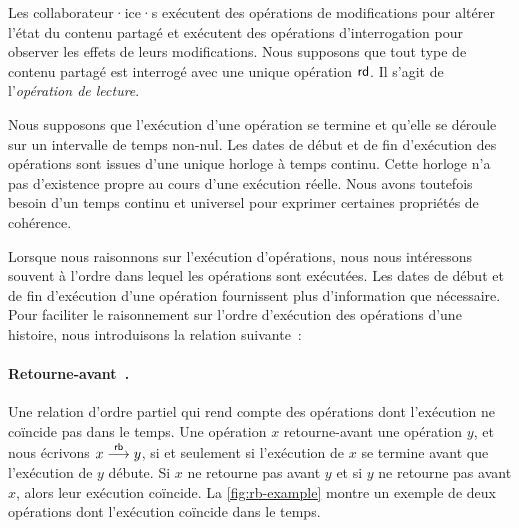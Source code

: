 Les collaborateur·ice·s exécutent des opérations de modifications pour altérer l'état du contenu partagé et exécutent des opérations d'interrogation pour observer les effets de leurs modifications.
Nous supposons que tout type de contenu partagé est interrogé avec une unique opération $\operatorname{\mathsf{rd}}$.
Il s'agit de l'\emph{opération de lecture}.

Nous supposons que l'exécution d'une opération se termine et qu'elle se déroule sur un intervalle de temps non-nul.
Les dates de début et de fin d'exécution des opérations sont issues d'une unique horloge à temps continu.
Cette horloge n'a pas d'existence propre au cours d'une exécution réelle.
Nous avons toutefois besoin d'un temps continu et universel pour exprimer certaines propriétés de cohérence.

Lorsque nous raisonnons sur l'exécution d'opérations, nous nous intéressons souvent à l'ordre dans lequel les opérations sont exécutées.
Les dates de début et de fin d'exécution d'une opération fournissent plus d'information que nécessaire.
Pour faciliter le raisonnement sur l'ordre d'exécution des opérations d'une histoire, nous introduisons la relation suivante~:

\paragraph{Retourne-avant~\autocite{burckhardt_eventualconsistency_2014}.} Une relation d'ordre partiel qui rend compte des opérations dont l'exécution ne coïncide pas dans le temps.
Une opération $x$ retourne-avant une opération $y$, et nous écrivons $x \overset{\mathsf{rb}}{\longrightarrow} y$, si et seulement si l'exécution de $x$ se termine avant que l'exécution de $y$ débute.
Si $x$ ne retourne pas avant $y$ et si $y$ ne retourne pas avant $x$, alors leur exécution coïncide.
La \autoref{fig:rb-example} montre un exemple de deux opérations dont l'exécution coïncide dans le temps.

\clearpage %

